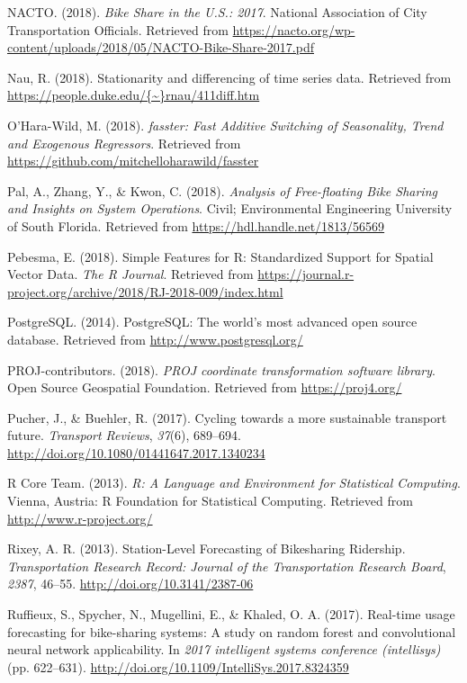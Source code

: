 \documentclass[12pt,oneside]{reedthesis}
\begin{document}
\hypertarget{ref-nacto2018}{}
NACTO. (2018). \emph{Bike Share in the U.S.: 2017}. National Association
of City Transportation Officials. Retrieved from
\url{https://nacto.org/wp-content/uploads/2018/05/NACTO-Bike-Share-2017.pdf}

\hypertarget{ref-nau2018}{}
Nau, R. (2018). Stationarity and differencing of time series data.
Retrieved from
\href{https://people.duke.edu/\%7B~\%7Drnau/411diff.htm}{https://people.duke.edu/\{\textasciitilde{}\}rnau/411diff.htm}

\hypertarget{ref-fasster}{}
O'Hara-Wild, M. (2018). \emph{fasster: Fast Additive Switching of
Seasonality, Trend and Exogenous Regressors}. Retrieved from
\url{https://github.com/mitchelloharawild/fasster}

\hypertarget{ref-pal2018}{}
Pal, A., Zhang, Y., \& Kwon, C. (2018). \emph{Analysis of Free-floating
Bike Sharing and Insights on System Operations}. Civil; Environmental
Engineering University of South Florida. Retrieved from
\url{https://hdl.handle.net/1813/56569}

\hypertarget{ref-sf}{}
Pebesma, E. (2018). Simple Features for R: Standardized Support for
Spatial Vector Data. \emph{The R Journal}. Retrieved from
\url{https://journal.r-project.org/archive/2018/RJ-2018-009/index.html}

\hypertarget{ref-postgres}{}
PostgreSQL. (2014). PostgreSQL: The world's most advanced open source
database. Retrieved from \url{http://www.postgresql.org/}

\hypertarget{ref-proj}{}
PROJ-contributors. (2018). \emph{PROJ coordinate transformation software
library}. Open Source Geospatial Foundation. Retrieved from
\url{https://proj4.org/}

\hypertarget{ref-pucher2017}{}
Pucher, J., \& Buehler, R. (2017). Cycling towards a more sustainable
transport future. \emph{Transport Reviews}, \emph{37}(6), 689--694.
\url{http://doi.org/10.1080/01441647.2017.1340234}

\hypertarget{ref-rlanguage}{}
R Core Team. (2013). \emph{R: A Language and Environment for Statistical
Computing}. Vienna, Austria: R Foundation for Statistical Computing.
Retrieved from \url{http://www.r-project.org/}

\hypertarget{ref-rixley2013}{}
Rixey, A. R. (2013). Station-Level Forecasting of Bikesharing Ridership.
\emph{Transportation Research Record: Journal of the Transportation
Research Board}, \emph{2387}, 46--55.
\url{http://doi.org/10.3141/2387-06}

\hypertarget{ref-ruffieux2017}{}
Ruffieux, S., Spycher, N., Mugellini, E., \& Khaled, O. A. (2017).
Real-time usage forecasting for bike-sharing systems: A study on random
forest and convolutional neural network applicability. In \emph{2017
intelligent systems conference (intellisys)} (pp. 622--631).
\url{http://doi.org/10.1109/IntelliSys.2017.8324359}
\end{document}
